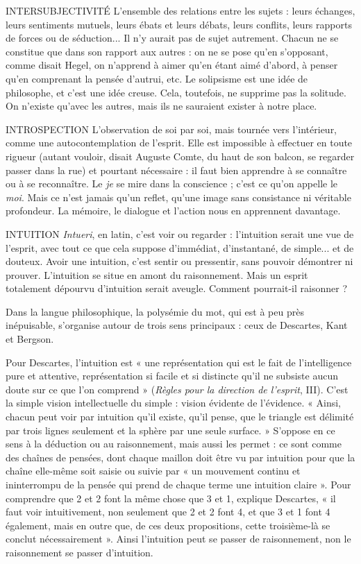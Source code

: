 {%
INTERSUBJECTIVITÉ L'ensemble des relations entre les sujets : leurs
échanges, leurs sentiments mutuels, leurs ébats et
leurs débats, leurs conflits, leurs rapports de forces ou de séduction... Il n’y
aurait pas de sujet autrement. Chacun ne se constitue que dans son rapport aux
autres : on ne se pose qu’en s’opposant, comme disait Hegel, on n’apprend à
aimer qu’en étant aimé d’abord, à penser qu’en comprenant la pensée d'autrui,
etc. Le solipsisme est une idée de philosophe, et c’est une idée creuse. Cela, toutefois,
ne supprime pas la solitude. On n'existe qu’avec les autres, mais ils ne
sauraient exister à notre place.

INTROSPECTION L'observation de soi par soi, mais tournée vers l’intérieur,
comme une autocontemplation de l'esprit. Elle
est impossible à effectuer en toute rigueur (autant vouloir, disait Auguste
Comte, du haut de son balcon, se regarder passer dans la rue) et pourtant
nécessaire : il faut bien apprendre à se connaître ou à se reconnaître. Le {\it je} se
mire dans la conscience ; c’est ce qu’on appelle le {\it moi}. Mais ce n’est jamais
qu’un reflet, qu'une image sans consistance ni véritable profondeur. La
mémoire, le dialogue et l’action nous en apprennent davantage.

INTUITION  {\it Intueri}, en latin, c’est voir ou regarder : l’intuition serait une
vue de l'esprit, avec tout ce que cela suppose d’immédiat,
d’instantané, de simple... et de douteux. Avoir une intuition, c’est sentir ou
pressentir, sans pouvoir démontrer ni prouver. L’intuition se situe en amont du
raisonnement. Mais un esprit totalement dépourvu d’intuition serait aveugle.
Comment pourrait-il raisonner ?

Dans la langue philosophique, la polysémie du mot, qui est à peu près inépuisable,
s'organise autour de trois sens principaux : ceux de Descartes, Kant et
Bergson.

Pour Descartes, l'intuition est « une représentation qui est le fait de l’intelligence
pure et attentive, représentation si facile et si distincte qu’il ne subsiste
aucun doute sur ce que l’on comprend » ({\it Règles pour la direction de l'esprit}, III).
C’est la simple vision intellectuelle du simple : vision évidente de l'évidence.
« Ainsi, chacun peut voir par intuition qu’il existe, qu’il pense, que le triangle
est délimité par trois lignes seulement et la sphère par une seule surface. »
S’oppose en ce sens à la déduction ou au raisonnement, mais aussi les permet :
ce sont comme des chaînes de pensées, dont chaque maillon doit être vu par
intuition pour que la chaîne elle-même soit saisie ou suivie par « un mouvement
continu et ininterrompu de la pensée qui prend de chaque terme une
intuition claire ». Pour comprendre que 2 et 2 font la même chose que 3 et 1,
explique Descartes, « il faut voir intuitivement, non seulement que 2 et 2 font
4, et que 3 et 1 font 4 également, mais en outre que, de ces deux propositions,
cette troisième-là se conclut nécessairement ». Ainsi l'intuition peut se passer de
raisonnement, non le raisonnement se passer d’intuition.

}
